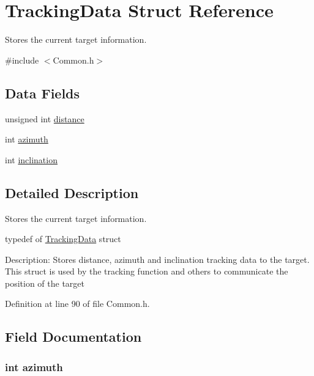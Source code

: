 \hypertarget{struct_tracking_data}{\section{Tracking\+Data Struct Reference}
\label{struct_tracking_data}
}


Stores the current target information.  




{\ttfamily \#include $<$Common.\+h$>$}

\subsection*{Data Fields}
\begin{DoxyCompactItemize}
\item 
unsigned int \hyperlink{struct_tracking_data_a4bb47863775a37236bda65273c01b275}{distance}
\item 
int \hyperlink{struct_tracking_data_a866e78e12cb32dcaf1ded89bda8be8f5}{azimuth}
\item 
int \hyperlink{struct_tracking_data_af308b9934394c8bcf7614eb1df2d863f}{inclination}
\end{DoxyCompactItemize}


\subsection{Detailed Description}
Stores the current target information. 



 typedef of \hyperlink{struct_tracking_data}{Tracking\+Data} struct

Description\+: Stores distance, azimuth and inclination tracking data to the target. This struct is used by the tracking function and others to communicate the position of the target 

Definition at line 90 of file Common.\+h.



\subsection{Field Documentation}
\hypertarget{struct_tracking_data_a866e78e12cb32dcaf1ded89bda8be8f5}{
\subsubsection[{azimuth}]{\setlength{\rightskip}{0pt plus 5cm}int azimuth}}\label{struct_tracking_data_a866e78e12cb32dcaf1ded89bda8be8f5}


